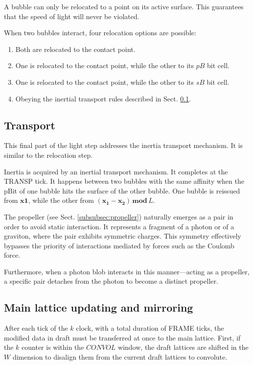 \documentclass[12pt]{article}
\begin{document}
A bubble can only be relocated to a point on its active surface. This guarantees that the speed of light will never be violated. 

When two bubbles interact, four relocation options are possible:

\begin{enumerate}
\item Both are relocated to the contact point.
    \item One is relocated to the contact point, while the other to its $pB$ bit cell.
    \item One is relocated to the contact point, while the other to its $sB$ bit cell.
    \item Obeying the inertial transport rules described in Sect. \ref{subsec:transport}.
\end{enumerate}

\subsection{Transport} \label{subsec:transport}
This final part of the light step addresses the inertia transport mechanism. It is similar to the relocation step.

Inertia is acquired by an inertial transport mechanism. It completes at the TRANSP tick. It happens between two bubbles with the same affinity when the pBit of one bubble hits the surface of the other bubble. One bubble is reissued from $\boldsymbol{x1}$, while the other from $(\boldsymbol{x_1}-\boldsymbol{x_2})\,\boldsymbol{mod}\,L$.

The propeller (see Sect. \ref{subsubsec:propeller}) naturally emerges as a pair in order to avoid static interaction. It represents a fragment of a photon or of a graviton, where the pair exhibits symmetric charges. This symmetry effectively bypasses the priority of interactions mediated by forces such as the Coulomb force. 

Furthermore, when a photon blob interacts in this manner—acting as a propeller, a specific pair detaches from the photon to become a distinct propeller.


\subsection{Main lattice updating and mirroring} \label{subsec:updating}
After each tick of the $k$ clock, with a total duration of FRAME ticks, the modified data in draft must be transferred at once to the main lattice. First, if the $k$ counter is within the $CONVOL$ window, the draft lattices are shifted in the $W  $ dimension to disalign them from the current draft lattices to convolute.
\end{document}
